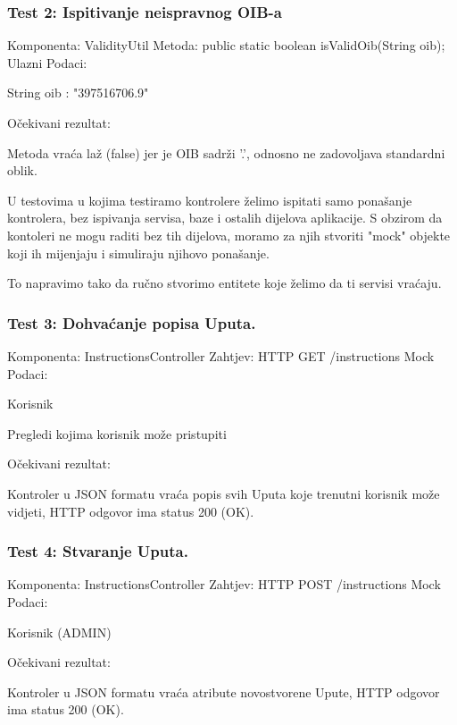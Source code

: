 			\subsubsection*{Test 2: Ispitivanje neispravnog OIB-a}
			Komponenta: ValidityUtil \newline
			Metoda: public static boolean isValidOib(String oib); \newline
			Ulazni Podaci: 
			\begin{packed_item}
				\item String oib : "397516706.9"
			\end{packed_item}
			Očekivani rezultat:
			\begin{packed_item}
				\item Metoda vraća laž (false) jer je OIB sadrži '.', odnosno ne zadovoljava standardni oblik.
			\end{packed_item}

			U testovima u kojima testiramo kontrolere želimo ispitati samo ponašanje kontrolera, bez ispivanja servisa, baze i ostalih dijelova aplikacije.
			S obzirom da kontoleri ne mogu raditi bez tih dijelova, moramo za njih stvoriti "mock" objekte koji ih mijenjaju i simuliraju njihovo ponašanje.

			To napravimo tako da ručno stvorimo entitete koje želimo da ti servisi vraćaju.

			\subsubsection*{Test 3: Dohvaćanje popisa Uputa.}
			Komponenta: InstructionsController \newline
			Zahtjev: HTTP GET /instructions \newline
			Mock Podaci:
			\begin{packed_item}
				\item Korisnik
				\item Pregledi kojima korisnik može pristupiti
			\end{packed_item}
			Očekivani rezultat:
			\begin{packed_item}
				\item Kontroler u JSON formatu vraća popis svih Uputa koje trenutni korisnik može vidjeti, HTTP odgovor ima status 200 (OK).
			\end{packed_item}
			
			\subsubsection*{Test 4: Stvaranje Uputa.}
			Komponenta: InstructionsController \newline
			Zahtjev: HTTP POST /instructions \newline
			Mock Podaci:
			\begin{packed_item}
				\item Korisnik (ADMIN)
			\end{packed_item}
			Očekivani rezultat:
			\begin{packed_item}
				\item Kontroler u JSON formatu vraća atribute novostvorene Upute, HTTP odgovor ima status 200 (OK).
			\end{packed_item}

